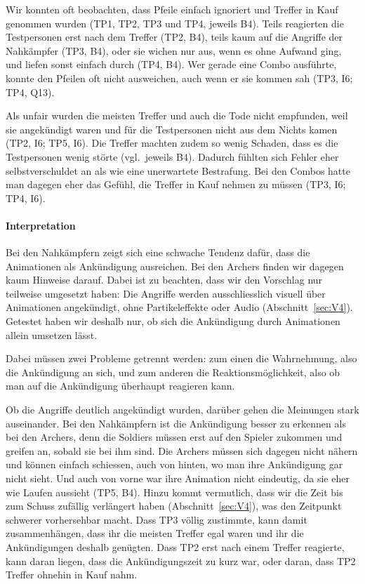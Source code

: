 \documentclass[../Main.tex]{subfiles}
\begin{document}
Wir konnten oft beobachten, dass Pfeile einfach ignoriert und Treffer in Kauf genommen wurden (TP1, TP2, TP3 und TP4, jeweils B4). Teils reagierten die Testpersonen erst nach dem Treffer (TP2, B4), teils kaum auf die Angriffe der Nahkämpfer (TP3, B4), oder sie wichen nur aus, wenn es ohne Aufwand ging, und liefen sonst einfach durch (TP4, B4). Wer gerade eine Combo ausführte, konnte den Pfeilen oft nicht ausweichen, auch wenn er sie kommen sah (TP3, I6; TP4, Q13).

Als unfair wurden die meisten Treffer und auch die Tode nicht empfunden, weil sie angekündigt waren und für die Testpersonen nicht aus dem Nichts kamen (TP2, I6; TP5, I6). Die Treffer machten zudem so wenig Schaden, dass es die Testpersonen wenig störte (vgl.\ jeweils B4). Dadurch fühlten sich Fehler eher selbstverschuldet an als wie eine unerwartete Bestrafung. Bei den Combos hatte man dagegen eher das Gefühl, die Treffer in Kauf nehmen zu müssen (TP3, I6; TP4, I6).

\paragraph{Interpretation}
Bei den Nahkämpfern zeigt sich eine schwache Tendenz dafür, dass die Animationen als Ankündigung ausreichen. Bei den Archers finden wir dagegen kaum Hinweise darauf. Dabei ist zu beachten, dass wir den Vorschlag nur teilweise umgesetzt haben: Die Angriffe werden ausschliesslich visuell über Animationen angekündigt, ohne Partikeleffekte oder Audio (Abschnitt~\ref{sec:V4}). Getestet haben wir deshalb nur, ob sich die Ankündigung durch Animationen allein umsetzen lässt.

Dabei müssen zwei Probleme getrennt werden: zum einen die Wahrnehmung, also die Ankündigung an sich, und zum anderen die Reaktionsmöglichkeit, also ob man auf die Ankündigung überhaupt reagieren kann.

Ob die Angriffe deutlich angekündigt wurden, darüber gehen die Meinungen stark auseinander. Bei den Nahkämpfern ist die Ankündigung besser zu erkennen als bei den Archers, denn die Soldiers müssen erst auf den Spieler zukommen und greifen an, sobald sie bei ihm sind. Die Archers müssen sich dagegen nicht nähern und können einfach schiessen, auch von hinten, wo man ihre Ankündigung gar nicht sieht. Und auch von vorne war ihre Animation nicht eindeutig, da sie eher wie Laufen aussieht (TP5, B4). Hinzu kommt vermutlich, dass wir die Zeit bis zum Schuss zufällig verlängert haben (Abschnitt~\ref{sec:V4}), was den Zeitpunkt schwerer vorhersehbar macht. Dass TP3 völlig zustimmte, kann damit zusammenhängen, dass ihr die meisten Treffer egal waren und ihr die Ankündigungen deshalb genügten. Dass TP2 erst nach einem Treffer reagierte, kann daran liegen, dass die Ankündigungszeit zu kurz war, oder daran, dass TP2 Treffer ohnehin in Kauf nahm.
\end{document}
